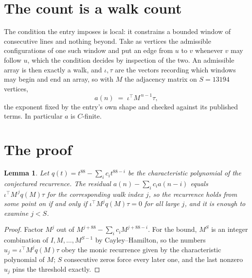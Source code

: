 \documentclass[11pt,a4paper]{article}
\theoremstyle{plain}
\newtheorem{lemma}[theorem]{Lemma}
\theoremstyle{definition}
\begin{document}
\section{The count is a walk count}

The condition the entry imposes is local: it constrains a bounded window of consecutive lines and nothing beyond. Take as vertices the admissible configurations of one such window and put an edge from $u$ to $v$ whenever $v$ may follow $u$, which the condition decides by inspection of the two.
An admissible array is then exactly a walk, and $\iota,\tau$ are the vectors recording which windows may begin and end an array, so with $M$ the adjacency matrix on $S=13194$ vertices,
\[
a(n)\;=\;\iota^{\!\top}M^{\,n-1}\tau ,
\]
the exponent fixed by the entry's own shape and checked against its published terms. In
particular $a$ is $C$-finite.

\section{The proof}

\begin{lemma}\label{lem:crit}
Let $q(t)=t^{88}-\sum_i c_it^{88-i}$ be the characteristic polynomial of the
conjectured recurrence. The residual $a(n)-\sum_ic_ia(n-i)$ equals
$\iota^{\!\top}M^{\,j}q(M)\tau$ for the corresponding walk index $j$, so the recurrence
holds from some point on if and only if $\iota^{\!\top}M^{j}q(M)\tau=0$ for all large $j$,
and it is enough to examine $j<S$.
\end{lemma}

\begin{proof}
Factor $M^{j}$ out of $M^{j+88}-\sum_ic_iM^{j+88-i}$. For the bound, $M^{S}$
is an integer combination of $I,M,\dots,M^{S-1}$ by Cayley--Hamilton, so the numbers
$u_j=\iota^{\!\top}M^{j}q(M)\tau$ obey the monic recurrence given by the characteristic
polynomial of $M$; $S$ consecutive zeros force every later one, and the last nonzero $u_j$
pins the threshold exactly.
\end{proof}
\end{document}
